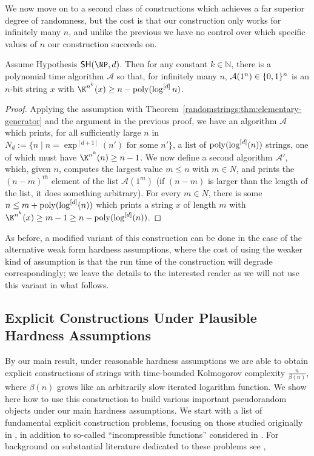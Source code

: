 We now move on to a second class of constructions which achieves a far superior degree of randomness, but the cost is that our construction only works for infinitely many $n$, and unlike the previous we have no control over which specific values of $n$ our construction succeeds on.

\begin{theorem}\label{randomstrings:thm:elementary-strings-io}
    Assume Hypothesis $\SH(\NP,d)$. Then for any constant $k \in \mathbb{N}$, there is a polynomial time algorithm $\mathcal{A}$ so that, for infinitely many $n$, $\mathcal{A}(1^n) \in \{0,1\}^{n}$ is an $n$-bit string $x$ with $\K^{n^k}(x) \geq  n - \poly(\log^{[d]}n)$. 
\end{theorem}
\begin{proof}
Applying the assumption with Theorem~\ref{randomstrings:thm:elementary-generator} and the argument in the previous proof, we have an algorithm $\mathcal{A}$ which prints, for all sufficiently large $n$ in $N_d:=\{ n \mid n = \exp^{[d+1]}(n') \text{ for some } n'\}$, a list of $\mathrm{poly}(\log^{[d]}(n))$ strings, one of which must have $\K^{n^k}(n) \geq n-1$. We now define a second algorithm $\mathcal{A}'$, which, given $n$, computes the largest value $m \leq  n$ with $m \in N$, and prints the $(n - m)^{th}$ element of the list $\mathcal{A}(1^m)$ (if $(n-m)$ is larger than the length of the list, it does something arbitrary). For every $m \in N$, there is some $n \leq m + \mathrm{poly}(\log^{[d]}(n))$ which prints a string $x$ of length $m$ with $\K^{n^k}(x) \geq m-1 \geq n - \poly(\log^{[d]}(n))$. 
\end{proof}

As before, a modified variant of this construction can be done in the case of the alternative weak form hardness assumptions, where the cost of using the weaker kind of assumption is that the run time of the construction will degrade correspondingly; we leave the details to the interested reader as we will not use this variant in what follows.


\subsection{Explicit Constructions Under Plausible Hardness Assumptions}\label{randomstrings:subsec:ecs}
By our main result, under reasonable hardness assumptions we are able to obtain explicit constructions of strings with time-bounded Kolmogorov complexity $\frac{n}{\beta(n)}$, where $\beta(n)$ grows like an arbitrarily slow iterated logarithm function. We show here how to use this construction to build various important pseudorandom objects under our main hardness assumptions. We start with a list of fundamental explicit construction problems, focusing on those studied originally in \cite{Korten21}, in addition to so-called ``incompressible functions'' considered in \cite{incompressible}. For background on substantial literature dedicated to these problems see \cite{Korten21,incompressible},

